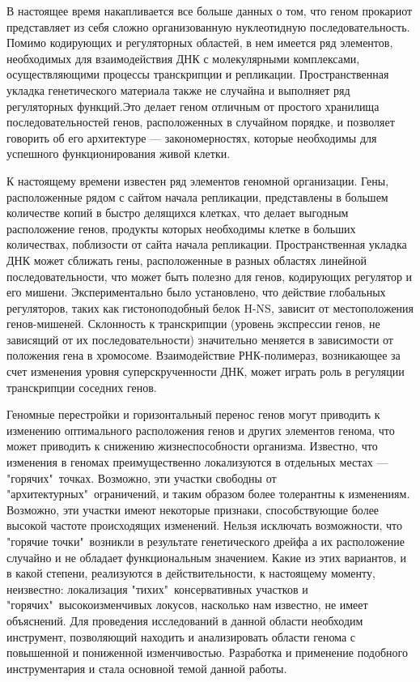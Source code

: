 
{\actuality} В настоящее время накапливается все больше данных о том, что геном прокариот представляет из себя сложно организованную нуклеотидную последовательность. Помимо кодирующих и регуляторных областей, в нем имеется ряд элементов, необходимых для взаимодействия ДНК с молекулярными комплексами, осуществляющими процессы транскрипции и репликации. Пространственная укладка генетического материала также не случайна и выполняет ряд регуляторных функций.Это делает геном отличным от простого хранилища последовательностей генов, расположенных в случайном порядке, и позволяет говорить об его архитектуре --- закономерностях, которые необходимы для успешного функционирования живой клетки.

К настоящему времени известен ряд элементов геномной организации. Гены, расположенные рядом с сайтом начала репликации, представлены в большем количестве копий в быстро делящихся клетках, что делает выгодным расположение генов, продукты которых необходимы клетке в больших количествах, поблизости от сайта начала репликации. Пространственная укладка ДНК может сближать гены, расположенные в разных областях линейной последовательности, что может быть полезно для генов, кодирующих регулятор и его мишени. Экспериментально было установлено, что действие глобальных регуляторов, таких как гистоноподобный белок H-NS, зависит от местоположения генов-мишеней. Склонность к транскрипции (уровень экспрессии генов, не зависящий от их последовательности) значительно меняется в зависимости от положения гена в хромосоме. Взаимодействие РНК-полимераз, возникающее за счет изменения уровня суперскрученности ДНК, может играть роль в регуляции транскрипции соседних генов.

Геномные перестройки и горизонтальный перенос генов могут приводить к изменению оптимального расположения генов и других элементов генома, что может приводить к снижению жизнеспособности организма. Известно, что изменения в геномах преимущественно локализуются в отдельных местах --- "горячих"\ точках. Возможно, эти участки свободны от "архитектурных"\ ограничений, и таким образом более толерантны к изменениям. Возможно, эти участки имеют некоторые признаки, способствующие более высокой частоте происходящих изменений. Нельзя исключать возможности, что "горячие точки"\ возникли в результате генетического дрейфа а их расположение случайно и не обладает функциональным значением. Какие из этих вариантов, и в какой степени, реализуются в действительности, к настоящему моменту, неизвестно: локализация "тихих"\ консервативных участков и "горячих"\ высокоизменчивых локусов, насколько нам известно, не имеет объяснений. Для проведения исследований в данной области необходим инструмент, позволяющий находить и анализировать области генома с повышенной и пониженной изменчивостью. Разработка и применение подобного инструментария и стала основной темой данной работы. 

